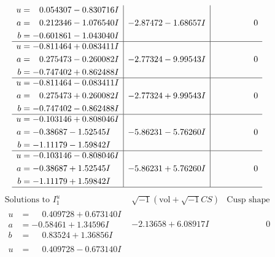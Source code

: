 \documentclass[1p]{elsarticle_modified}
\theoremstyle{definition}
\newcommand{\I}{\sqrt{-1}}
\begin{document}
$$\begin{array}{c|c|c}
\begin{aligned}
u &= \phantom{-}0.054307 - 0.830716 I \\
a &= \phantom{-}0.212346 - 1.076540 I \\
b &= -0.601861 - 1.043040 I\end{aligned}
 & -2.87472 - 1.68657 I & \phantom{-0.000000 } 0 \\ \hline\begin{aligned}
u &= -0.811464 + 0.083411 I \\
a &= \phantom{-}0.275473 - 0.260082 I \\
b &= -0.747402 + 0.862488 I\end{aligned}
 & -2.77324 - 9.99543 I & \phantom{-0.000000 } 0 \\ \hline\begin{aligned}
u &= -0.811464 - 0.083411 I \\
a &= \phantom{-}0.275473 + 0.260082 I \\
b &= -0.747402 - 0.862488 I\end{aligned}
 & -2.77324 + 9.99543 I & \phantom{-0.000000 } 0 \\ \hline\begin{aligned}
u &= -0.103146 + 0.808046 I \\
a &= -0.38687 - 1.52545 I \\
b &= -1.11179 - 1.59842 I\end{aligned}
 & -5.86231 - 5.76260 I & \phantom{-0.000000 } 0 \\ \hline\begin{aligned}
u &= -0.103146 - 0.808046 I \\
a &= -0.38687 + 1.52545 I \\
b &= -1.11179 + 1.59842 I\end{aligned}
 & -5.86231 + 5.76260 I & \phantom{-0.000000 } 0\\
 \hline 
 \end{array}$$\newpage$$\begin{array}{c|c|c}  
\text{Solutions to }I^u_{1}& \I (\text{vol} + \sqrt{-1}CS) & \text{Cusp shape}\\
 \hline 
\begin{aligned}
u &= \phantom{-}0.409728 + 0.673140 I \\
a &= -0.58461 + 1.34596 I \\
b &= \phantom{-}0.83524 + 1.36856 I\end{aligned}
 & -2.13658 + 6.08917 I & \phantom{-0.000000 } 0 \\ \hline\begin{aligned}
u &= \phantom{-}0.409728 - 0.673140 I \\

\end{aligned}
\end{array}$$
\end{document}

